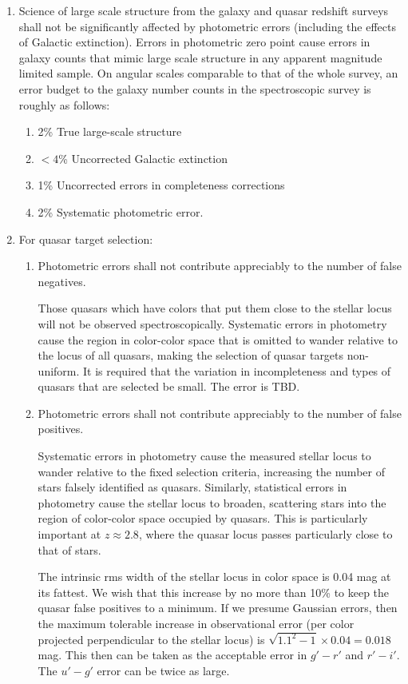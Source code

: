 \begin{enumerate} 
\item Science of large scale structure from the galaxy and quasar
redshift surveys shall not 
be significantly affected by photometric errors (including the effects
of Galactic extinction).  Errors in
photometric zero point cause errors in galaxy counts that
mimic large scale structure in any apparent magnitude limited sample.
On angular scales comparable to that of the whole survey, an error
budget to the galaxy number counts in the 
spectroscopic survey is roughly as follows:
\begin{enumerate}
\item 2\% True large-scale structure
\item $<4$\% Uncorrected Galactic extinction
\item 1\% Uncorrected errors in completeness corrections
\item 2\% Systematic photometric error.
\end{enumerate}

\item For quasar target selection:
\begin{enumerate} 
\item Photometric errors shall not contribute appreciably to the
number of false negatives. 

Those quasars which have colors that put them close to the
stellar locus will not be observed spectroscopically.
Systematic errors in photometry cause the region in color-color space 
that is omitted to wander relative to the locus of all quasars, making
the selection of quasar targets non-uniform.
It is required that the variation in incompleteness and types of
quasars that are selected be small.  The error is TBD.

\item Photometric errors shall not contribute appreciably to the
number of false positives. 

Systematic errors in photometry cause the measured stellar locus
to wander relative to the fixed selection criteria, increasing the
number of stars falsely identified as quasars.  Similarly, statistical
errors in photometry cause the stellar locus to broaden, scattering stars
into the region of color-color space occupied by quasars. This is
particularly important at $z \approx 2.8$, where the quasar locus
passes particularly close to that of stars. 

The intrinsic rms width of the stellar locus in color space is 0.04
mag at its fattest.  We wish that this increase by no more than 10\%
to keep the quasar false positives to a minimum.  If we presume
Gaussian errors, then the maximum 
tolerable increase in observational error (per color projected
perpendicular to the stellar locus) is $\sqrt{1.1^2-1}\times 0.04 =
0.018$ mag.  This then can be taken as the acceptable error in $g'-r'$
and $r'-i'$.  The $u'-g'$ error can be twice as large.  


\end{enumerate}
\end{enumerate}
